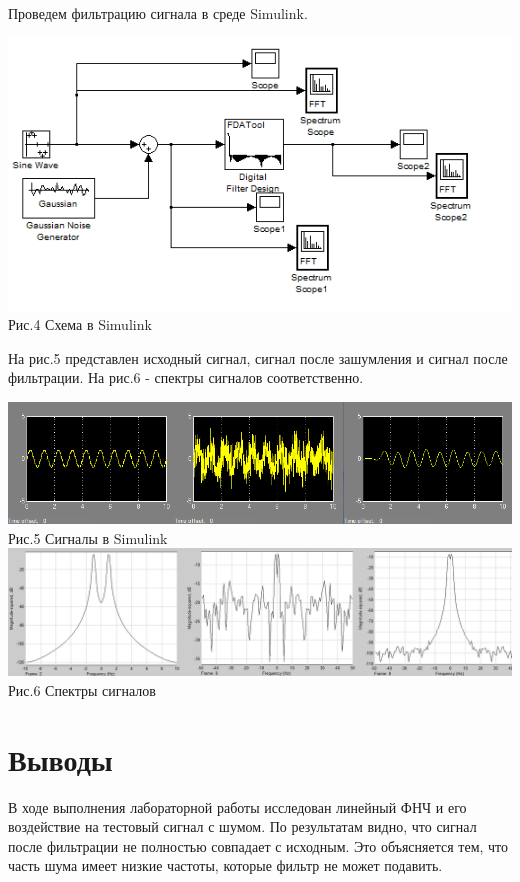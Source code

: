 \documentclass[a4paper]{article}
\begin{document}
Проведем фильтрацию сигнала в среде Simulink.

\begin{center}
	\includegraphics[scale = 1]{scheme.png}\\Рис.4 Схема в Simulink
\end{center}

На рис.5 представлен исходный сигнал, сигнал после зашумления и сигнал после фильтрации. На рис.6 - спектры сигналов соответственно.

\begin{center}
	\includegraphics[scale = 0.7]{sim1.png}\\Рис.5 Сигналы в Simulink
	\includegraphics[scale = 0.4]{sim2.png}\\Рис.6 Спектры сигналов
\end{center}

\section{Выводы}
В ходе выполнения лабораторной работы исследован линейный ФНЧ и его воздействие на тестовый сигнал с шумом. По результатам видно, что сигнал после фильтрации не полностью совпадает с исходным. Это объясняется тем, что часть шума имеет низкие частоты, которые фильтр не может подавить.
\end{document}
